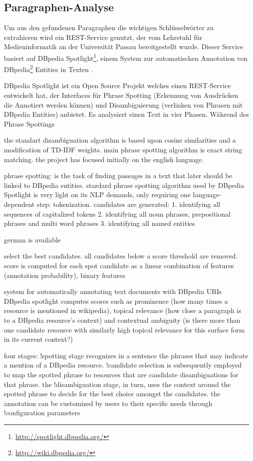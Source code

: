  \subsection{Paragraphen-Analyse}
 Um aus den gefundenen Paragraphen die wichtigen Schlüsselwörter zu extrahieren wird ein REST-Service genutzt, der vom Lehrstuhl für Medieninformatik an der Universität Passau bereitgestellt wurde. Dieser Service basiert auf DBpedia Spotlight\footnote{\url{http://spotlight.dbpedia.org/}}, einem System zur automatischen Annotation von DBpedia\footnote{\url{http://wiki.dbpedia.org/}} Entities in Texten \cite{daiber2013improving}. 

 DBpedia Spotlight ist ein Open Source Projekt welches einen REST-Service entwickelt hat, der Interfaces für Phrase Spotting (Erkennung von Ausdrücken die Annotiert werden können) und Disambiguierung (verlinken von Phrasen mit DBpedia Entities) anbietet. Es analysiert einen Text in vier Phasen. Während des Phrase Spottings
 
 the standart disambiguation algorithm is based upon cosine similarities and a modification of TD-IDF weights. main phrase spotting algorithm is exact string matching.
 the project has focused initially on the english language.

 phrase spotting: is the task of finding passages in a text that later should be linked to DBpedia entities. stardard phrase spotting algorithm used by DBpedia Spotlight is very light on its NLP demands, only requiring one language-dependent step: tokenization.
 candidates are generated:
 	1. identifying all sequences of capitalized tokens
 	2. identifying all noun phrases, prepositional phrases and multi word phrases
 	3. identifying all named entities

 german is available

 select the best candidates. all candidates below a score threshold are removed.
 score is computed for each spot candidate as a linear combination of features (annotation probability), binary features
 \cite{daiber2013improving}


 system for automatically annotating text documents with DBpedia URIs
 DBpedia spotlight computes scores such as prominence (how many times a resource is mentioned in wikipedia), topical relevance (how close a paragraph is to a DBpedia resource's context) and contextual ambiguity (is there more than one candidate resource with similarly high topical relevance for this surface form in its current context?)

 four stages: !spotting stage recognizes in a sentence the phrases that may indicate a mention of a DBpedia resource. 
 !candidate selection is subsequently employed to map the spotted phrase to resources that are candidate disambiguations for that phrase.
 the !disambiguation stage, in turn, uses the context around the spotted phrase to decide for the best choice amongst the candidates. 
 the annotation can be customized by users to their specific needs through !configuration parameters

